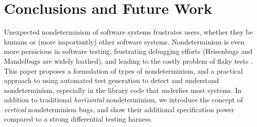 \section{Conclusions and Future Work}

Unexpected nondeterminism of software systems frustrates users,
whether they be humans or (more importantly) other software systems.
Nondeterminism is even more pernicious in software testing,
frustrating debugging efforts (Heisenbugs \cite{Heisenbug} and
Mandelbugs \cite{GrottkeBugs,FaultTriggers} are widely loathed), and
leading to the costly problem of flaky tests
\cite{miccoflaky,listfieldtestanalysis}.
This paper proposes a formulation of types of nondeterminism, and a
practical approach to using automated test generation to detect and understand
nondeterminism, especially in the library code that underlies most
systems. In addition to traditional \emph{horizontal} nondeterminism, we introduce
the concept of \emph{vertical} nondeterminism bugs, and show their
additional specification power compared to a
strong differential testing harness.  
\begin{comment}
We implemented our approach in the
TSTL automated test generation system for Python, and demonstrated the
simplicity and utility of the approach on real-world examples.


As future work, we would like to support the automatic detection of opaque
values; if a value (e.g., a timestamp) is different in \emph{every}
trace, it is likely opaque.  This would make
testing libraries with intended nondeterminism much easier. Similarly, for
vertical nondeterminism, we would like to
automatically identify idempotent operations.
Finally, we are interested in using test decomposition
\cite{Composition} to isolate and understand
nondeterminism in unit tests, and to mitigate flaky tests.
Reliable detection of nondeterminism is a critical tool in making such
an approach efficient and reliable.
\end{comment}

